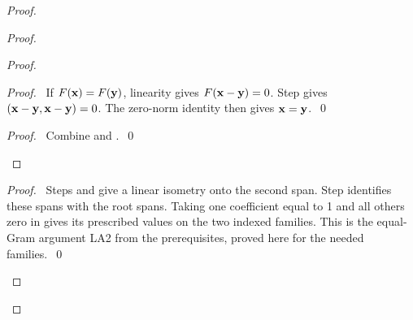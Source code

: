 \begin{proof}
\begin{proof}
\begin{proof}
\begin{proof}
    \pf\ If $F({\mathbf x})=F({\mathbf y})$, linearity gives $F({\mathbf x}-{\mathbf y})=0$.
    Step  gives $({\mathbf x}-{\mathbf y},{\mathbf x}-{\mathbf y})=0$.
    The zero-norm identity then gives ${\mathbf x}={\mathbf y}$.~\qed
   \end{proof}
   \qedstep
   \begin{proof}\pf\ Combine  and .~\qed\end{proof}
  \end{proof}
  \qedstep
  \begin{proof}
   \pf\ Steps  and  give a linear isometry
   onto the second span. Step  identifies these spans with the root spans.
   Taking one coefficient equal to 1 and all others zero in 
   gives its prescribed values on the two indexed families.
   This is the equal-Gram argument LA2 from the prerequisites, proved here for the needed families.~\qed
  \end{proof}
 \end{proof}


\end{proof}
